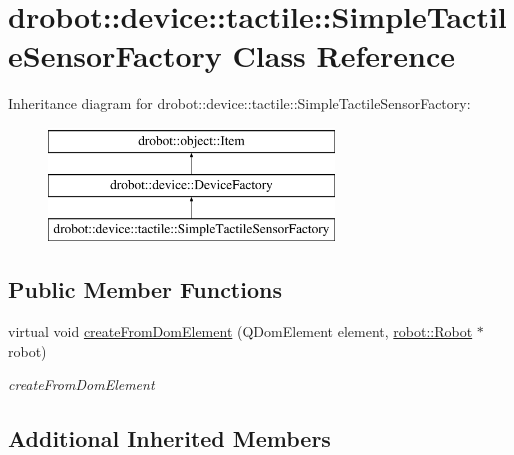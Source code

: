 \hypertarget{classdrobot_1_1device_1_1tactile_1_1SimpleTactileSensorFactory}{\section{drobot\-:\-:device\-:\-:tactile\-:\-:Simple\-Tactile\-Sensor\-Factory Class Reference}
\label{classdrobot_1_1device_1_1tactile_1_1SimpleTactileSensorFactory}
}
Inheritance diagram for drobot\-:\-:device\-:\-:tactile\-:\-:Simple\-Tactile\-Sensor\-Factory\-:\begin{figure}[H]
\begin{center}
\leavevmode
\includegraphics[height=3.000000cm]{classdrobot_1_1device_1_1tactile_1_1SimpleTactileSensorFactory}
\end{center}
\end{figure}
\subsection*{Public Member Functions}
\begin{DoxyCompactItemize}
\item 
virtual void \hyperlink{classdrobot_1_1device_1_1tactile_1_1SimpleTactileSensorFactory_a727416e619c23b25a01818e33f327d6c}{create\-From\-Dom\-Element} (Q\-Dom\-Element element, \hyperlink{classdrobot_1_1robot_1_1Robot}{robot\-::\-Robot} $\ast$robot)
\begin{DoxyCompactList}\small\item\em create\-From\-Dom\-Element \end{DoxyCompactList}\end{DoxyCompactItemize}
\subsection*{Additional Inherited Members}


